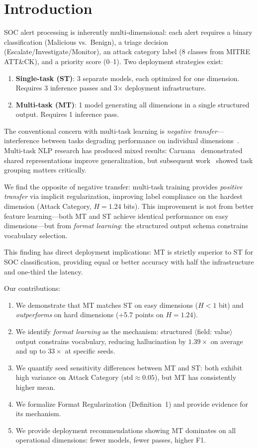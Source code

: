 \documentclass[review,3p]{elsarticle}
\begin{document}
\section{Introduction}

SOC alert processing is inherently multi-dimensional: each alert requires a binary classification (Malicious vs.\ Benign), a triage decision (Escalate/Investigate/Monitor), an attack category label (8 classes from MITRE ATT\&CK), and a priority score (0--1). Two deployment strategies exist:

\begin{enumerate}
\item \textbf{Single-task (ST)}: 3 separate models, each optimized for one dimension. Requires 3 inference passes and 3$\times$ deployment infrastructure.
\item \textbf{Multi-task (MT)}: 1 model generating all dimensions in a single structured output. Requires 1 inference pass.
\end{enumerate}

The conventional concern with multi-task learning is \emph{negative transfer}---interference between tasks degrading performance on individual dimensions~\cite{zhang2022,standley2020}. Multi-task NLP research has produced mixed results: Caruana~\cite{caruana1997} demonstrated shared representations improve generalization, but subsequent work~\cite{standley2020} showed task grouping matters critically.

We find the opposite of negative transfer: multi-task training provides \emph{positive transfer} via implicit regularization, improving label compliance on the hardest dimension (Attack Category, $H=1.24$ bits). This improvement is not from better feature learning---both MT and ST achieve identical performance on easy dimensions---but from \emph{format learning}: the structured output schema constrains vocabulary selection.

This finding has direct deployment implications: MT is strictly superior to ST for SOC classification, providing equal or better accuracy with half the infrastructure and one-third the latency.

Our contributions:
\begin{enumerate}
\item We demonstrate that MT matches ST on easy dimensions ($H < 1$ bit) and \emph{outperforms} on hard dimensions (+5.7 points on $H = 1.24$).
\item We identify \emph{format learning} as the mechanism: structured $\langle$field: value$\rangle$ output constrains vocabulary, reducing hallucination by $1.39\times$ on average and up to $33\times$ at specific seeds.
\item We quantify seed sensitivity differences between MT and ST: both exhibit high variance on Attack Category ($\text{std} \approx 0.05$), but MT has consistently higher mean.
\item We formalize Format Regularization (Definition~1) and provide evidence for its mechanism.
\item We provide deployment recommendations showing MT dominates on all operational dimensions: fewer models, fewer passes, higher F1.
\end{enumerate}
\end{document}
